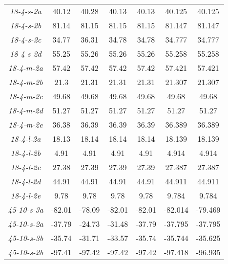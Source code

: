 {\begin{longtable}{ccccccc}
\emph{18-4-s-2a}    &   40.12   &   40.28       &   40.13       &   40.13       &   40.125  &   40.125  \\
\emph{18-4-s-2b}    &   81.14   &   81.15       &   81.15       &   81.15       &   81.147  &   81.147  \\
\emph{18-4-s-2c}    &   34.77   &   36.31       &   34.78       &   34.78       &   34.777  &   34.777  \\
\emph{18-4-s-2d}    &   55.25   &   55.26       &   55.26       &   55.26       &   55.258  &   55.258  \\
\emph{18-4-m-2a}    &   57.42   &   57.42       &   57.42       &   57.42       &   57.421  &   57.421  \\
\emph{18-4-m-2b}    &   21.3    &   21.31       &   21.31       &   21.31       &   21.307  &   21.307  \\
\emph{18-4-m-2c}    &   49.68   &   49.68       &   49.68       &   49.68       &   49.68   &   49.68   \\
\emph{18-4-m-2d}    &   51.27   &   51.27       &   51.27       &   51.27       &   51.27   &   51.27   \\
\emph{18-4-m-2e}    &   36.38   &   36.39       &   36.39       &   36.39       &   36.389  &   36.389  \\
\emph{18-4-l-2a}    &   18.13   &   18.14       &   18.14       &   18.14       &   18.139  &   18.139  \\
\emph{18-4-l-2b}    &   4.91    &   4.91        &   4.91        &   4.91        &   4.914   &   4.914   \\
\emph{18-4-l-2c}    &   27.38   &   27.39       &   27.39       &   27.39       &   27.387  &   27.387  \\
\emph{18-4-l-2d}    &   44.91   &   44.91       &   44.91       &   44.91       &   44.911  &   44.911  \\
\emph{18-4-l-2e}    &   9.78    &   9.78        &   9.78        &   9.78        &   9.784   &   9.784   \\ \hline
\emph{45-10-s-3a}   &   -82.01  &   -78.09      &   -82.01      &   -82.01      &   -82.014 &   -79.469 \\
\emph{45-10-s-2a}   &   -37.79  &   -24.73      &   -31.48      &   -37.79      &   -37.795 &   -37.795 \\
\emph{45-10-s-3b}   &   -35.74  &   -31.71      &   -33.57      &   -35.74      &   -35.744 &   -35.625 \\
\emph{45-10-s-2b}   &   -97.41  &   -97.42      &   -97.42      &   -97.42      &   -97.418 &   -96.935 \\

\end{longtable}}
